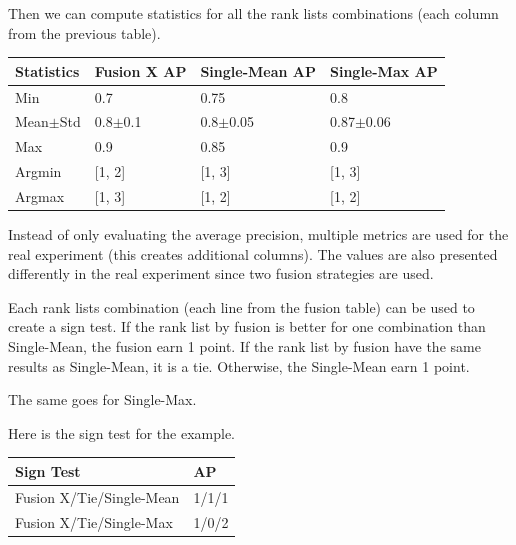 \begin{example*}
  \vspace{0.5cm}

  Then we can compute statistics for all the rank lists combinations (each column from the previous table).

  \vspace{0.2cm}

  \begin{center}
    \begin{tabular}{l|l l l}
      \toprule
      Statistics        & Fusion X AP   & Single-Mean AP  & Single-Max AP\\
      \midrule
      Min               & 0.7         & 0.75            & 0.8 \\
      Mean$\pm$Std      & 0.8$\pm$0.1 & 0.8$\pm$0.05    & 0.87$\pm$0.06 \\
      Max               & 0.9         & 0.85            & 0.9 \\
      Argmin            & [1, 2]      & [1, 3]          & [1, 3] \\
      Argmax            & [1, 3]      & [1, 2]          & [1, 2] \\
      \bottomrule
    \end{tabular}
  \end{center}

  \vspace{0.2cm}

  Instead of only evaluating the average precision, multiple metrics are used for the real experiment (this creates additional columns).
  The values are also presented differently in the real experiment since two fusion strategies are used.

  \vspace{0.5cm}

  Each rank lists combination (each line from the fusion table) can be used to create a sign test.
  If the rank list by fusion is better for one combination than Single-Mean, the fusion earn 1 point.
  If the rank list by fusion have the same results as Single-Mean, it is a tie.
  Otherwise, the Single-Mean earn 1 point.

  The same goes for Single-Max.

  Here is the sign test for the example.

  \vspace{0.2cm}

  \begin{center}
    \begin{tabular}{l|l }
      \toprule
      Sign Test                & AP\\
      \midrule
      Fusion X/Tie/Single-Mean & 1/1/1 \\
      Fusion X/Tie/Single-Max  & 1/0/2 \\
      \bottomrule
    \end{tabular}
  \end{center}

\end{example*}


